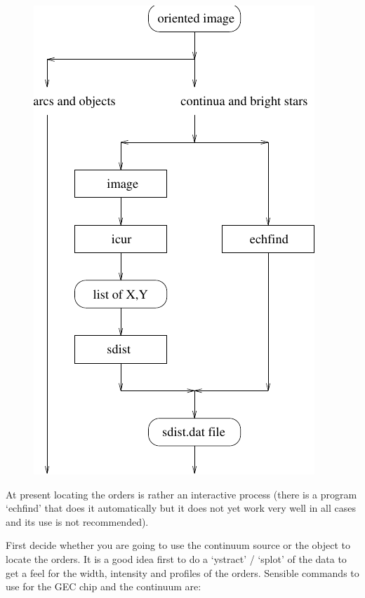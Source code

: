 \documentclass[11pt,twoside]{article}
\newcommand{\htmladdimg}[1]{}
\newenvironment{latexonly}{}{}
\begin{document}
\begin{latexonly}
\begin{figure}[htb]
\begin{center}
\includegraphics{sun86_ech2}
\end{center}
\end{figure}
\end{latexonly}
\htmladdimg{echelle2.png}

   At present locating the orders is rather an interactive process
   (there is a program `echfind' that does it automatically but it does
   not yet work very well in all cases and its use is not recommended).

   First decide whether you are going to use the continuum source or the
   object to locate the orders. It is a good idea first to do a
   `ystract' / `splot' of the data to get a feel for the width,
   intensity and profiles of the orders. Sensible commands to use for
   the GEC chip and the continuum are:
\end{document}
